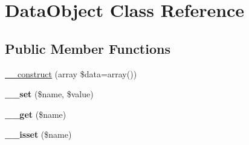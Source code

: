 \hypertarget{class_utopia_1_1_components_1_1_core_1_1_data_object}{
\section{DataObject Class Reference}
\label{class_utopia_1_1_components_1_1_core_1_1_data_object}
}
\subsection*{Public Member Functions}
\begin{DoxyCompactItemize}
\item 
\hyperlink{class_utopia_1_1_components_1_1_core_1_1_data_object_a6bd3293453513bdd71206ddc92de2c14}{\_\-\_\-construct} (array \$data=array())
\item 
\hypertarget{class_utopia_1_1_components_1_1_core_1_1_data_object_a83c2703c91959192f759992ad5640b67}{
{\bfseries \_\-\_\-set} (\$name, \$value)}
\label{class_utopia_1_1_components_1_1_core_1_1_data_object_a83c2703c91959192f759992ad5640b67}

\item 
\hypertarget{class_utopia_1_1_components_1_1_core_1_1_data_object_abc8e9e31bb15c8a44c3210ec551407c8}{
{\bfseries \_\-\_\-get} (\$name)}
\label{class_utopia_1_1_components_1_1_core_1_1_data_object_abc8e9e31bb15c8a44c3210ec551407c8}

\item 
\hypertarget{class_utopia_1_1_components_1_1_core_1_1_data_object_a8f132f051b7cd7d570ccb9f6e2bb4201}{
{\bfseries \_\-\_\-isset} (\$name)}
\label{class_utopia_1_1_components_1_1_core_1_1_data_object_a8f132f051b7cd7d570ccb9f6e2bb4201}


\end{DoxyCompactItemize}
